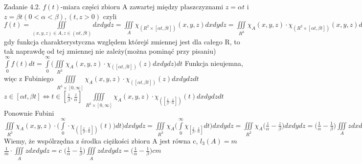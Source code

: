 \documentclass{article}
\begin{document}
Zadanie 4.2.
\newline
\newline
$
f(t)$-miara części zbioru A zawartej między płaszczyznami $z=\alpha t$ i $z=\beta t(0<\alpha<\beta),(t,z>0)
$\newline
czyli
$
f(t)=\iiint\limits_{(x,y,z)\in A,z\in(\alpha t,\beta t)}dxdydz
=
\iiint\limits_{A}\chi_{(R^2\times[\alpha t,\beta t])}(x,y,z)dxdydz
=
\iiint\limits_{R^3}\chi_{A}(x,y,z)\cdot\chi_{(R^2\times[\alpha t,\beta t])}(x,y,z)dxdydz
$
gdy funkcja charakterystyczna względem którejś zmiennej jest dla całego R, to tak naprawdę od tej zmiennej nie zależy(można pominąć przy pisaniu)
\newline
$
\int\limits_{0}^{\infty}f(t)dt
=
\int\limits_{0}^{\infty}\bigl(\iiint\limits_{R^3}\chi_{A}(x,y,z)\cdot\chi_{([\alpha t,\beta t])}(z)dxdydz\bigr)dt
$\newline
Funkcja nieujemna, więc z Fubiniego
$
\iiiint\limits_{R^3\times[0,\infty]}\chi_{A}(x,y,z)\cdot\chi_{([\alpha t,\beta t])}(z)dxdydzdt
$\newline
$
z\in[\alpha t,\beta t] \Leftrightarrow t\in[\frac{z}{\beta},\frac{z}{\alpha}]
$
$
\iiiint\limits_{R^3\times[0,\infty]}\chi_{A}(x,y,z)\cdot\chi_{([\frac{z}{\beta},\frac{z}{\alpha}])}(t)dxdydzdt
$
Ponownie Fubini
$
\iiint\limits_{R^3}\chi_{A}(x,y,z)\cdot\bigl(\int\limits_{0}^{\infty}\cdot\chi_{([\frac{z}{\beta},\frac{z}{\alpha}])}(t))dt\bigr)dxdydz
=
\iiint\limits_{R^3}\chi_{A}\bigl(\int\limits_{0}^{\infty}\chi_{[\frac{z}{\beta},\frac{z}{\alpha}]}dt\bigr)dxdydz
=
\iiint\limits_{R^3}\chi_{A}\bigl(\frac{z}{\alpha}-\frac{z}{\beta}\bigr)dxdydz
=
\bigl(\frac{1}{\alpha}-\frac{1}{\beta}\bigr)\iiint\limits_{A}zdxdydz
$
Wiemy, że wspólrzędna z środka ciężkości zbioru A jest równa c, $l_{3}(A)=m$\quad
$
\frac{1}{m}\cdot\iiint\limits_{A}zdxdydz=c
$
$
\bigl(\frac{1}{\alpha}-\frac{1}{\beta}\bigr)\iiint\limits_{A}zdxdydz
=
\bigl(\frac{1}{\alpha}-\frac{1}{\beta}\bigr)cm
$
\newline
\newline
\end{document}
